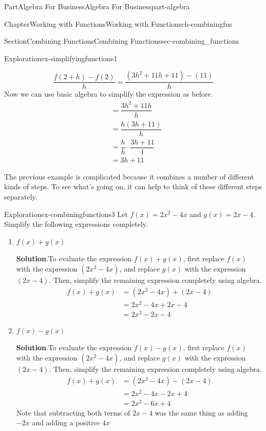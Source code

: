 \documentclass[oneside,10pt,]{tufte-book}
\newcommand{\blocktitlefont}{\relax}
\numberwithin{equation}{chapter}
\newcommand{\amp}{&}
\begin{document}
\begin{partptx}{Part}{Algebra For Business}{}{Algebra For Business}{}{}{part-algebra}
\begin{chapterptx}{Chapter}{Working with Functions}{}{Working with Functions}{}{}{ch-combiningfns}
\begin{sectionptx}{Section}{Combining Functions}{}{Combining Functions}{}{}{sec-combining_functions}
\begin{exploration}{Exploration}{}{ex-simplifyingfunctions1}
\begin{enumerate}[font=\bfseries,label=(\alph*),ref=\alph*]
\begin{equation*}
\dfrac{f(2+h)-f(2)}{h} = \dfrac{(3h^2+11h+11)-(11)}{h}
\end{equation*}
Now we can use basic algebra to simplify the expression as before.%
\begin{align*}
\amp = \dfrac{3h^2+11h}{h}\\
\amp = \dfrac{h(3h+11)}{h}\\
\amp = \dfrac{h}{h}\cdot \dfrac{3h+11}{1}\\
\amp = 3h+11
\end{align*}
%
\end{enumerate}%
\end{exploration}%
The previous example is complicated because it combines a number of different kinds of steps. To see what's going on, it can help to think of these different steps separately.%
\begin{exploration}{Exploration}{}{ex-combiningfunctions3}%
Let \(f(x) = 2x^2-4x\) and \(g(x)=2x-4\).  Simplify the following expressions completely.%
\begin{enumerate}[font=\bfseries,label=(\alph*),ref=\alph*]%
\item{}\(f(x)+g(x)\)%
\par\smallskip%
\noindent\textbf{\blocktitlefont Solution}.\hypertarget{ex-combiningfunctions3-2-2}{}\quad{}To evaluate the expression \(f(x)+g(x)\), first replace \(f(x)\) with the expression \((2x^2-4x)\), and replace \(g(x)\) with the expression \((2x-4)\).  Then, simplify the remaining expression completely using algebra.%
\begin{align*}
f(x)+g(x)\amp =(2x^2-4x) + (2x-4)\\
\amp = 2x^2-4x + 2x - 4\\
\amp = 2x^2 -2x -4 
\end{align*}
%
\item{}\(f(x)-g(x)\)%
\par\smallskip%
\noindent\textbf{\blocktitlefont Solution}.\hypertarget{ex-combiningfunctions3-3-2}{}\quad{}To evaluate the expression \(f(x)-g(x)\), first replace \(f(x)\) with the expression \((2x^2-4x)\), and replace \(g(x)\) with the expression \((2x-4)\).  Then, simplify the remaining expression completely using algebra.%
\begin{align*}
f(x)+g(x)\amp =(2x^2-4x) - (2x-4)\\
\amp = 2x^2-4x - 2x + 4\\
\amp = 2x^2 -6x + 4
\end{align*}
Note that subtracting both terms of \(2x-4\) was the same thing as adding \(-2x\) and adding a positive \(4x\)%

\end{enumerate}
\end{exploration}
\end{sectionptx}
\end{chapterptx}
\end{partptx}
\end{document}
